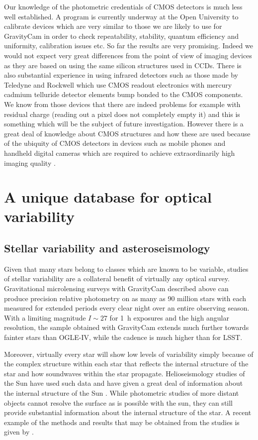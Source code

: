 \documentclass{pasa}%
\begin{document}
Our knowledge of the photometric credentials of CMOS detectors is much less well established. A program is currently underway at the Open University to calibrate devices which are very similar to those we 
are likely to use for GravityCam in order to check repeatability, stability, quantum efficiency and uniformity, calibration issues etc. So far the results are very promising. Indeed we would not expect very great differences from the point of view of imaging devices as they are based on using the same silicon structures used in CCDs. There is also substantial experience in using infrared detectors such as those made by 
Teledyne and Rockwell which use CMOS readout electronics with mercury cadmium telluride detector elements bump bonded to the CMOS components. We know from those devices that there are indeed problems for example with residual charge (reading out a pixel does not completely empty it) and this is something which will be the subject of future investigation. However there is a great deal of knowledge about CMOS structures and how these are used because of the ubiquity of CMOS detectors in devices such as mobile phones and handheld digital cameras which are required to achieve extraordinarily high imaging quality \citep{Janesick2014}.



\section{A unique database for optical variability}


\subsection{Stellar variability and asteroseismology}

Given that many stars belong to classes which are known to be variable, studies of stellar variability are a collateral benefit of virtually any optical survey. Gravitational microlensing surveys with \mbox{GravityCam} described above can produce precision relative photometry on as many as 90 million stars with each measured for extended periods every clear night over an entire observing season. With a limiting magnitude $I \sim 27$ for 1~h exposures and the high angular resolution, the sample obtained with \mbox{GravityCam} extends much further towards fainter stars than OGLE-IV, while the cadence is much higher than for LSST. 

Moreover, virtually every star will show low levels of variability simply because of the complex structure within each star that reflects the internal structure of the star and how soundwaves within the star propagate.  Helioseismology studies of the Sun have used such data and have given a great deal of information about the internal structure of the Sun \citep{Gough2012}.  While photometric studies of more distant objects cannot resolve the surface as is possible with the sun,  they can still provide substantial information about the internal structure of the star.  A recent example of the methods and results that may be obtained from the studies is given by \citet{Bowman+2016}.
\end{document}

